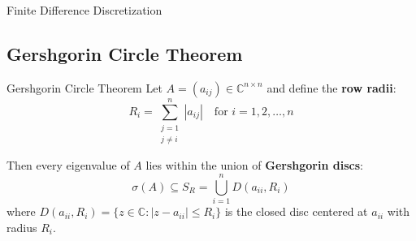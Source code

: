 \begin{example}{Finite Difference Discretization}{}
\begin{center}
    \end{center}
\end{example}

\subsection{Gershgorin Circle Theorem}

\begin{theorem}{Gershgorin Circle Theorem}{}
    Let $A = (a_{ij}) \in \mathbb{C}^{n \times n}$ and define the \textbf{row radii}:
    \begin{equation}
        R_i = \sum_{\substack{j=1 \\ j \neq i}}^n |a_{ij}| \quad \text{for } i = 1, 2, \ldots, n
    \end{equation}

    Then every eigenvalue of $A$ lies within the union of \textbf{Gershgorin discs}:
    \begin{equation}
        \sigma(A) \subseteq S_R = \bigcup_{i=1}^n D(a_{ii}, R_i)
    \end{equation}
    where $D(a_{ii}, R_i) = \{ z \in \mathbb{C} : |z - a_{ii}| \leq R_i \}$ is the closed disc centered at $a_{ii}$ with radius $R_i$.
\end{theorem}

